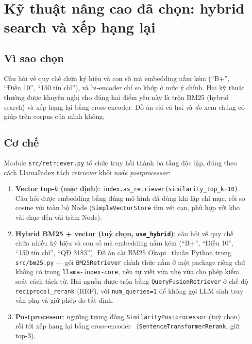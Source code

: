 \chapter{Kỹ thuật nâng cao đã chọn: hybrid search và xếp hạng lại}
\label{ch:nang-cao}

\section{Vì sao chọn}

Câu hỏi về quy chế chứa ký hiệu và con số mà embedding nắm kém (``B+'', ``Điều 10'', ``150 tín chỉ''),
và bi-encoder chỉ so khớp ở mức ý chính. Hai kỹ thuật thường được khuyến nghị cho đúng hai điểm yếu này
là trộn BM25 (hybrid search) và xếp hạng lại bằng cross-encoder. Đồ án cài cả hai và \emph{đo} xem
chúng có giúp trên corpus của mình không.

\section{Cơ chế}
\label{sec:hybrid}

Module \texttt{src/retriever.py} tổ chức truy hồi thành ba tầng độc lập, đúng theo cách LlamaIndex
tách \emph{retriever} khỏi \emph{node postprocessor}:

\begin{enumerate}
  \item \textbf{Vector top-$k$ (mặc định)}: \texttt{index.as\_retriever(similarity\_top\_k=10)}.
        Câu hỏi được embedding bằng đúng mô hình đã dùng khi lập chỉ mục, rồi so cosine với toàn bộ
        Node (\texttt{SimpleVectorStore} tìm vét cạn, phù hợp với kho vài chục đến vài trăm Node).
  \item \textbf{Hybrid BM25 + vector (tuỳ chọn, \texttt{use\_hybrid})}: câu hỏi về quy chế chứa nhiều
        ký hiệu và con số mà embedding nắm kém (``B+'', ``Điều 10'', ``150 tín chỉ'', ``QĐ 3183'').
        Đồ án cài BM25 Okapi~\cite{robertson2009bm25} thuần Python trong \texttt{src/bm25.py} ---
        gói \texttt{BM25Retriever} chính thức nằm ở một package riêng chứ không có trong
        \texttt{llama-index-core}, nên tự viết vừa nhẹ vừa cho phép kiểm soát cách tách từ.
        Hai nguồn được trộn bằng \texttt{QueryFusionRetriever} ở chế độ \texttt{reciprocal\_rerank}
        (RRF), với \texttt{num\_queries=1} để không gọi LLM sinh truy vấn phụ và giữ phép đo tất định.
  \item \textbf{Postprocessor}: ngưỡng tương đồng \texttt{SimilarityPostprocessor} (tuỳ chọn) rồi
        tới xếp hạng lại bằng cross-encoder~\cite{nogueira2019passage}
        (\texttt{SentenceTransformerRerank}, giữ top-3).
\end{enumerate}

